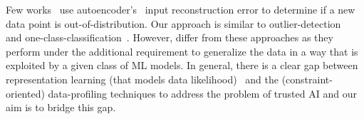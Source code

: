 Few works~\cite{DBLP:journals/corr/abs-1812-02765,
DBLP:journals/corr/HendrycksG16c, DBLP:journals/corr/abs-1909-03835} use
autoencoder's~\cite{hinton2006reducing, rumelhart1985learning} input
reconstruction error to determine if a new data point is out-of-distribution.
Our approach is similar to outlier-detection~\cite{kriegel2012outlier} and
one-class-classification~\cite{DBLP:conf/icann/TaxM03}. However, \dis differ
from these approaches as they perform under the additional requirement to
generalize the data in a way that is exploited by a given class of ML models.
In general, there is a clear gap between representation learning (that models
data likelihood)~\cite{hinton2006reducing, rumelhart1985learning,
achlioptas2017learning, karaletsos2015bayesian} and the (constraint-oriented)
data-profiling techniques to address the problem of trusted AI and our aim is
to bridge this gap.

\vspace{-1mm}









